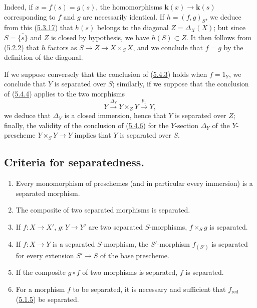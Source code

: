 Indeed, if $x=f(s)=g(s)$, the homomorphisms $\boldsymbol{k}(x)\to\boldsymbol{k}(s)$ corresponding to
$f$ and $g$ are necessarily identical. If $h=(f,g)_S$, we deduce from this
(\hyperref[I.5.3.17]{5.3.17}) that $h(s)$ belongs to the diagonal
$Z=\Delta_X(X)$; but since $S=\overline{\{s\}}$ and $Z$ is closed by
hypothesis, we have $h(S)\subset Z$. It then follows from
(\hyperref[I.5.2.2]{5.2.2}) that $h$ factors as
$S\to Z\to X\times_S X$, and we conclude that $f=g$ by the definition of the
diagonal.

\begin{remark}[5.4.8]
\label{I.5.4.8}
If we suppose conversely that the conclusion of
(\hyperref[I.5.4.3]{5.4.3}) holds when $f=1_Y$, we conclude
that $Y$ is separated over $S$; similarly, if we suppose that the conclusion
of (\hyperref[I.5.4.4]{5.4.4}) applies to the two morphisms
\[
  Y\xrightarrow{\Delta_Y}Y\times_Z Y\xrightarrow{p_1}Y,
\]
we deduce that $\Delta_Y$ is a closed immersion, hence that $Y$ is separated
over $Z$; finally, the validity of the conclusion of
(\hyperref[I.5.4.6]{5.4.6}) for the $Y$-section $\Delta_Y$ of the
$Y$-prescheme $Y\times_S Y\to Y$ implies that $Y$ is separated over
$S$.
\end{remark}


\subsection{Criteria for separatedness.}
\label{subsection:I.5.5}

\begin{proposition}[5.5.1]
\label{I.5.5.1}
\begin{enumerate}
  \item[\rm(i)] Every monomorphism of preschemes (and in particular every
    immersion) is a separated morphism.
  \item[\rm(ii)] The composite of two separated morphisms is separated.
  \item[\rm(iii)] If $f:X\to X'$, $g:Y\to Y'$ are two separated
    $S$-morphisms, $f\times_S g$ is separated.
  \item[\rm(iv)] If $f:X\to Y$ is a separated $S$-morphism, the
    $S'$-morphism $f_{(S')}$ is separated for every extension $S'\to S$ of the
    base prescheme.
  \item[\rm(v)] If the composite $g\circ f$ of two morphisms is separated, $f$
    is separated.
  \item[\rm(vi)] For a morphism $f$ to be separated, it is necessary and
    sufficient that $f_{\mathrm{red}}$ \textup{(\hyperref[I.5.1.5]{5.1.5})} be
    separated.
\end{enumerate}
\end{proposition}

